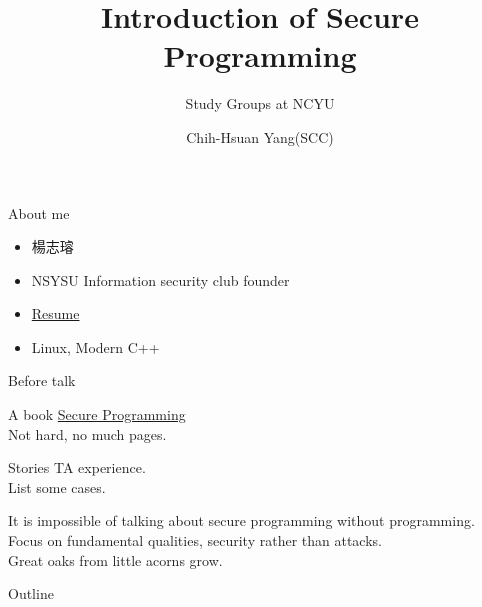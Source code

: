 \documentclass{beamer}
\begin{document}
\begin{CJK*}{UTF8}{bsmi}

    \title{Introduction of Secure Programming}
    \subtitle{Study Groups at NCYU}
    \author{Chih-Hsuan Yang(SCC)}

    \begin{frame}
        \titlepage
    \end{frame}

    \begin{frame}{About me}
        \begin{itemize}
            \item 楊志璿
            \item NSYSU Information security club founder
            \item \href{https://github.com/25077667/Resume/blob/main/resume/resume.pdf}{Resume}
            \item Linux, Modern C++
        \end{itemize}
    \end{frame}

    \begin{frame}{Before talk}
        \begin{multicols*}{2}
            \begin{beamerboxesrounded}[width=.43\textwidth]{A book}
                \href{https://dwheeler.com/secure-programs/}{Secure Programming}\\
                Not hard, no much pages.
            \end{beamerboxesrounded}
            \begin{beamerboxesrounded}[width=.47\textwidth]{Stories}
                TA experience.\\
                List some cases.
            \end{beamerboxesrounded}
        \end{multicols*}
        It is impossible of talking about secure programming without programming.\\
        Focus on fundamental qualities, security rather than attacks.\\
        Great oaks from little acorns grow.\\
    \end{frame}

    \begin{frame}{Outline}
        \begin{multicols}{2}
            \tableofcontents
        \end{multicols}
    \end{frame}


\end{CJK*}
\end{document}
